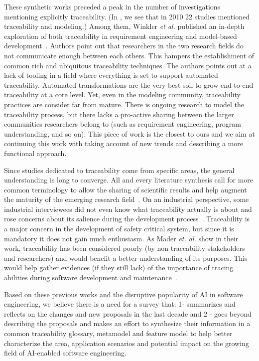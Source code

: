 These synthetic works preceded a peak in the number of investigations mentioning explicitly traceability. (In , we see that in 2010 22 studies mentioned traceability and modeling.) 
Among them, Winkler \textit{et al.} published an in-depth exploration of both traceability in requirement engineering and model-based development~\cite{winkler2010-survey-traceability-and-MDE}. 
Authors point out that researchers in the two research fields do not communicate enough between each others. This hampers the establishment of common rich and ubiquitous traceability techniques. The authors points out at a lack of tooling in a field where everything is set to support automated traceability. Automated transformations are the very best soil to grow end-to-end traceability at a core level. Yet, even in the modeling community, traceability practices are consider far from mature. There is ongoing research to model the traceability process, but there lacks a pro-active sharing between the larger communities researchers belong to (such as requirement engineering, program understanding, and so on). This piece of work is the closest to ours and we aim at continuing this work with taking account of new trends and describing a more functional approach.

Since studies dedicated to traceability come from specific areas, the general understanding is long to converge. All and every literature synthesis call for more common terminology to allow the sharing of scientific results and help augment the maturity of the emerging research field~\cite{winkler2010-survey-traceability-and-MDE}. On an industrial perspective, some industrial interviewees did not even know what traceability actually is about and rose concerns about its salience during the development process~\cite{vale2017-SPL-traceability-a-SMS,clelandhuang2014-traceability-trends-and-futurte-direction}. Traceability is a major concern in the development of safety critical system, but since it is mandatory it does not gain much enthusiasm. As Mader \textit{et. al.} show in their work, traceability has been considered poorly (by non-traceability stakeholders and researchers) and would benefit a better understanding of its purposes. This would help gather evidences (if they still lack) of the importance of tracing abilities during software development and maintenance~\cite{mader2009-motivation-matters-in-traceability-practitioner-survey}. 

Based on these previous works and the disruptive popularity of AI in software engineering, we believe there is a need for a survey that: 1- summarizes and reflects on the changes and new proposals in the last decade and 2 - goes beyond describing the proposals and makes an effort to synthesize their information in a common traceability glossary, metamodel and feature model to help better characterize the area, application scenarios and potential impact on the growing field of AI-enabled software engineering.

